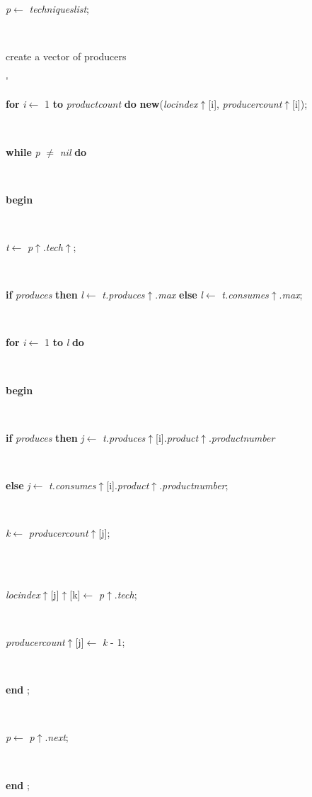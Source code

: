 \begin{tabbing}
\parbox{14cm}{\textsf{\textit{p}$\leftarrow$ \textit{techniqueslist}}; }\\
\<\<\<\parbox{3.5cm}{\scriptsize{create a vector of producers}}\'\>\>\>\parbox{14cm}{\textsf {\textbf {for } \textsf{\textit{i}$\leftarrow$ 1} \textbf{ to } \textsf{\textit{productcount}} \textbf{ do } \textsf{\textbf{new}(\textit{locindex}$\uparrow$\textit{}[i], \textit{producercount}$\uparrow$\textit{}[i])}; }}\\
\+\parbox{14cm}{\textsf {\textbf {while } \textsf{\textit{p} $\neq$ \textit{nil}} \textbf{ do } }}\\
\<\parbox{14cm}{\textsf{\textbf{begin} }}\\
\parbox{14cm}{\textsf{\textit{t}$\leftarrow$ \textit{p}$\uparrow$.\textit{tech}$\uparrow$\textit{}}; }\\
\parbox{14cm}{\textsf {\textbf {if } \textsf{\textit{produces}} \textbf{ then } \textsf{\textit{l}$\leftarrow$ \textit{t.produces}$\uparrow$.\textit{max}} \textbf{ else } \textsf{\textit{l}$\leftarrow$ \textit{t.consumes}$\uparrow$.\textit{max}}; }}\\
\+\parbox{14cm}{\textsf {\textbf {for } \textsf{\textit{i}$\leftarrow$ 1} \textbf{ to } \textsf{\textit{l}} \textbf{ do } }}\\
\<\parbox{14cm}{\textsf{\textbf{begin} }}\\
\+\parbox{14cm}{\textsf {\textbf {if } \textsf{\textit{produces}} \textbf{ then } \textsf{\textit{j}$\leftarrow$ \textit{t.produces}$\uparrow$\textit{}[i].\textit{product}$\uparrow$.\textit{productnumber}}}}\\
\-\<\parbox{14cm}{\textsf {\textbf {else } \textsf{\textit{j}$\leftarrow$ \textit{t.consumes}$\uparrow$\textit{}[i].\textit{product}$\uparrow$.\textit{productnumber}}; }}\\
\parbox{14cm}{\textsf{\textit{k}$\leftarrow$ \textit{producercount}$\uparrow$\textit{}[j]}; }\\
\\
\parbox{14cm}{\textsf{\textit{locindex}$\uparrow$\textit{}[j]$\uparrow$\textit{}[k]$\leftarrow$ \textit{p}$\uparrow$.\textit{tech}}; }\\
\parbox{14cm}{\textsf{\textit{producercount}$\uparrow$\textit{}[j]$\leftarrow$ \textit{k} - 1}; }\\
\<\-\parbox{14cm}{\textsf{\textbf{end} ;}}\\
\parbox{14cm}{\textsf{\textit{p}$\leftarrow$ \textit{p}$\uparrow$.\textit{next}}; }\\
\<\-\parbox{14cm}{\textsf{\textbf{end} ;}}\\

\end{tabbing}

